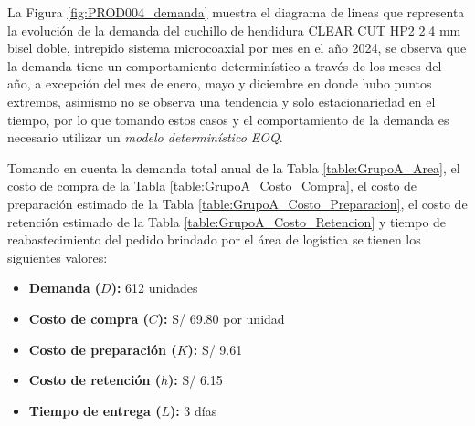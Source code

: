 La Figura \ref{fig:PROD004_demanda} muestra el diagrama de lineas que representa la evolución de la demanda del cuchillo de hendidura CLEAR CUT HP2 2.4 mm bisel doble, intrepido sistema microcoaxial por mes en el año 2024, se observa que la demanda tiene un comportamiento determinístico a través de los meses del año, a excepción del mes de enero, mayo y diciembre en donde hubo puntos extremos, asimismo no se observa una tendencia y solo estacionariedad en el tiempo, por lo que tomando estos casos y el comportamiento de la demanda es necesario utilizar un \textsl{modelo determinístico EOQ}.

Tomando en cuenta la demanda total anual de la Tabla \ref{table:GrupoA_Area}, el costo de compra de la Tabla \ref{table:GrupoA_Costo_Compra}, el costo de preparación estimado de la Tabla \ref{table:GrupoA_Costo_Preparacion}, el costo de retención estimado de la Tabla \ref{table:GrupoA_Costo_Retencion} y tiempo de reabastecimiento del pedido brindado por el área de logística se tienen los siguientes valores:

\begin{itemize}
    \item \textbf{Demanda ($D$):} 612 unidades
    \item \textbf{Costo de compra ($C$):} S/ 69.80 por unidad
    \item \textbf{Costo de preparación ($K$):} S/ 9.61
    \item \textbf{Costo de retención ($h$):} S/ 6.15
\end{itemize}
\begin{itemize}
  \item \textbf{Tiempo de entrega ($L$):} 3 días
\end{itemize}

